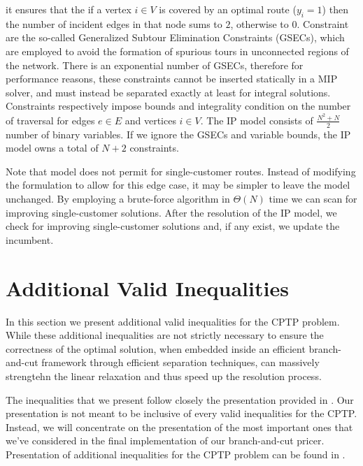 it ensures that the if a vertex $i \in V$ is covered by an optimal route ($y_i = 1$)
then the number of incident edges in that node sums to $2$, otherwise to $0$.
Constraint  are the so-called Generalized Subtour Elimination Constraints (GSECs),
which are employed to avoid the formation of spurious tours in unconnected regions of the network.
There is an exponential number of GSECs,
therefore for performance reasons,
these constraints cannot be inserted statically in a MIP solver,
and must instead be separated exactly at least for integral solutions.
Constraints  respectively
impose bounds and integrality condition
on the number of traversal for edges $e \in E$ and vertices $i \in V$.
The IP model consists of $\frac{N^2 + N}{2}$ number of binary variables.
If we ignore the GSECs and variable bounds, the IP model owns a total of $N + 2$ constraints.

\medskip

Note that model
does not permit for single-customer routes.
Instead of modifying the formulation to allow for this edge case,
it may be simpler to leave the model unchanged.
By employing a brute-force algorithm in $\Theta(N)$ time we can scan for improving single-customer solutions.
After the resolution of the IP model,
we check for improving single-customer solutions and,
if any exist,
we update the incumbent.

\section{Additional Valid Inequalities}
\label{sec:cptp-additional-valid-inequalities}

In this section we present additional valid inequalities for the CPTP problem.
While these additional inequalities are not strictly necessary
to ensure the correctness of the optimal solution,
when embedded inside an efficient branch-and-cut framework through efficient separation techniques,
can massively strengtehn the linear relaxation and thus speed up the resolution process.

The inequalities that we present follow closely the presentation provided in \textcite{jepsen2014}.
Our presentation is not meant to be inclusive of every valid inequalities for the CPTP.
Instead, we will concentrate on the presentation of the most important ones
that we've considered in the final implementation of our branch-and-cut pricer.
Presentation of additional inequalities for the CPTP problem can be found in \textcite{jepsen2014}.


